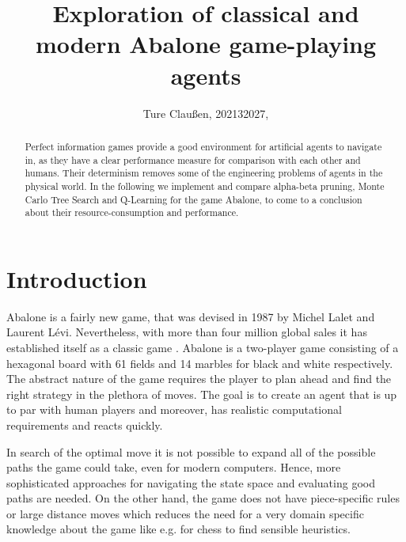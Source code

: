 \documentclass{llncs}
\begin{document}
\title{Exploration of classical and modern Abalone game-playing agents}
\author{Ture Claußen, 202132027, }

{\def\addcontentsline#1#2#3{}\maketitle} %

\begin{abstract}
  Perfect information games provide a good environment for artificial agents to navigate in, as they have a clear performance measure for comparison with each other and humans. Their determinism removes some of the engineering problems of agents in the physical world. In the following we implement and compare alpha-beta pruning, Monte Carlo Tree Search and Q-Learning for the game Abalone, to come to a conclusion about their resource-consumption and performance.
\end{abstract}

\section{Introduction}

Abalone is a fairly new game, that was devised in 1987 by Michel Lalet and Laurent Lévi. Nevertheless, with more than four million global sales it has established itself as a classic game \cite{noauthor_abalone_2020}. Abalone is a two-player game consisting of a hexagonal board with 61 fields and 14 marbles for black and white respectively. The abstract nature of the game requires the player to plan ahead and find the right strategy in the plethora of moves. The goal is to create an agent that is up to par with human players and moreover, has realistic computational requirements and reacts quickly.

In search of the optimal move it is not possible to expand all of the possible paths the game could take, even for modern computers. Hence, more sophisticated approaches for navigating the state space and evaluating good paths are needed. On the other hand, the game does not have piece-specific rules or large distance moves which reduces the need for a very domain specific knowledge about the game like e.g. for chess to find sensible heuristics.
\end{document}

